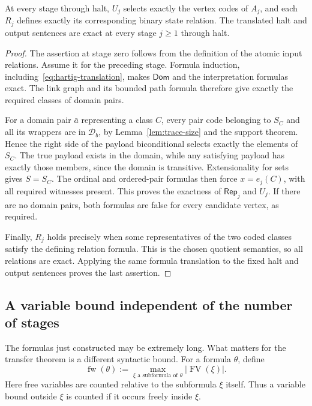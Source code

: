 \begin{lemma}\label{lem:state-exactness}
At every stage through halt, $U_j$ selects exactly the vertex codes of
$A_j$, and each $R_j$ defines exactly its corresponding binary state
relation. The translated halt and output sentences are exact at every
stage $j\ge1$ through halt.
\end{lemma}
\begin{proof}
The assertion at stage zero follows from the definition of the atomic
input relations. Assume it for the preceding stage. Formula induction,
including~\eqref{eq:hartig-translation}, makes $\mathsf{Dom}$ and the
interpretation formulas exact. The link graph and its bounded path
formula therefore give exactly the required classes of domain pairs.

For a domain pair $\bar a$ representing a class $C$, every pair code
belonging to $S_C$ and all its wrappers are in $\mathcal D_b$, by
Lemma~\ref{lem:trace-size} and the support theorem. Hence the right side
of the payload biconditional selects exactly the elements of $S_C$.
The true payload exists in the domain, while any satisfying payload
has exactly those members, since the domain is transitive. Extensionality
for sets gives $S=S_C$. The ordinal and ordered-pair formulas then force
$x=e_j(C)$, with all required witnesses present. This proves the exactness
of $\mathsf{Rep}_j$ and $U_j$. If there are no domain pairs, both formulas
are false for every candidate vertex, as required.

Finally, $R_j$ holds precisely when some representatives of the two
coded classes satisfy the defining relation formula. This is the chosen
quotient semantics, so all relations are exact. Applying the same
formula translation to the fixed halt and output sentences proves the
last assertion.
\end{proof}

\subsection{A variable bound independent of the number of stages}

The formulas just constructed may be extremely long. What matters for
the transfer theorem is a different syntactic bound. For a formula
$\theta$, define
\[
 \operatorname{fw}(\theta)
   :=\max_{\xi\text{ a subformula of }\theta}|\operatorname{FV}(\xi)|.
\]
Here free variables are counted relative to the subformula $\xi$ itself.
Thus a variable bound outside $\xi$ is counted if it occurs freely inside
$\xi$.

